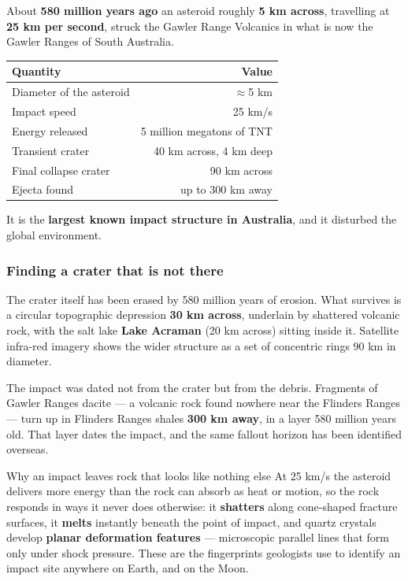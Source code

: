 \documentclass[11pt,a4paper]{article}
\newcommand{\vocab}[1]{\textbf{\textcolor{Space}{#1}}}
\begin{document}
About \textbf{580 million years ago} an asteroid roughly \textbf{5 km across},
travelling at \textbf{25 km per second}, struck the Gawler Range Volcanics in
what is now the Gawler Ranges of South Australia.

\begin{center}
\begin{tabular}{lr}
\toprule
\headingfont\textbf{Quantity} & \headingfont\textbf{Value} \\
\midrule
Diameter of the asteroid & $\approx$5 km \\
Impact speed & 25 km/s \\
Energy released & 5 million megatons of TNT \\
Transient crater & 40 km across, 4 km deep \\
Final collapse crater & 90 km across \\
Ejecta found & up to 300 km away \\
\bottomrule
\end{tabular}
\end{center}

It is the \textbf{largest known impact structure in Australia}, and it disturbed
the global environment.
\newpage
\subsubsection{Finding a crater that is not there}

The crater itself has been erased by 580 million years of erosion. What
survives is a circular topographic depression \textbf{30 km across}, underlain
by shattered volcanic rock, with the salt lake \textbf{Lake Acraman} (20 km
across) sitting inside it. Satellite infra-red imagery shows the wider
structure as a set of concentric rings 90 km in diameter.

The impact was dated not from the crater but from the debris. Fragments of
Gawler Ranges dacite --- a volcanic rock found nowhere near the Flinders Ranges
--- turn up in Flinders Ranges shales \textbf{300 km away}, in a layer 580
million years old. That layer dates the impact, and the same fallout horizon
has been identified overseas.

\begin{infobox}{Why an impact leaves rock that looks like nothing else}
At 25 km/s the asteroid delivers more energy than the rock can absorb as heat
or motion, so the rock responds in ways it never does otherwise: it
\textbf{shatters} along cone-shaped fracture surfaces, it \textbf{melts}
instantly beneath the point of impact, and quartz crystals develop
\vocab{planar deformation features} --- microscopic parallel lines that form
only under shock pressure. These are the fingerprints geologists use to
identify an impact site anywhere on Earth, and on the Moon.
\end{infobox}
\end{document}
